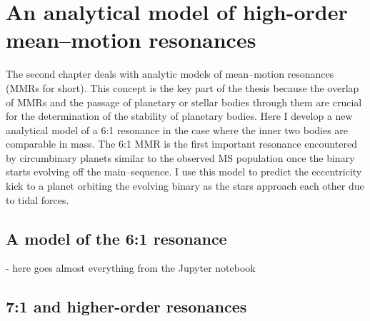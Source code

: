 \chapter{An analytical model of high-order mean--motion resonances}
\label{ch:analytical_model_of_high_order_mmrs}
The second chapter deals with analytic models of mean--motion resonances
(MMRs for short). This concept is the key part of the thesis because the overlap
of MMRs and the passage of planetary or stellar bodies through them 
are crucial for the determination of the stability of planetary bodies. 
Here I develop a new analytical model of a 6:1 resonance in the case 
where the inner two bodies are 
comparable in mass. The 6:1 MMR is the first important resonance encountered
by circumbinary planets similar to the observed MS population once the 
binary starts evolving off the main--sequence. I use this 
model to predict the eccentricity kick to a planet orbiting the evolving
binary as the stars approach each other due to tidal forces. 

\section{A model of the 6:1 resonance}
\label{sec:6_by_1_resonance}
- here goes almost everything from the Jupyter notebook

\section{7:1 and higher-order resonances}
\label{sec:7:1 and higher-order resonances}
